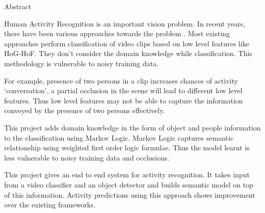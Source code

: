 \begin{center}
\LARGE{Abstract}
\end{center}

\vspace{0.5in}

Human Activity Recognition is an important vision problem.
In recent years, there have been various approaches towards the problem
\cite{actionsInContext,Realistic,improving,Parking}.
Most existing approaches perform classification of video clips 
based on low level features like HoG-HoF. They don't consider the domain knowledge while classification.
This methodology is vulnerable to noisy training data.

For example, presence of two persons in a clip increases chances of activity `conversation',
a partial occlusion in the scene will lead to different low level features.
Thus low level features may not be able to capture the information conveyed by 
the presence of two persons effectively.

This project adds domain knowledge in the form of object and people information
to the classification using Markov Logic. Markov Logic captures semantic relationship
using weighted first order logic formulae. Thus the model learnt is less vulnerable to noisy
training data and occlusions.

This project gives an end to end system for activity recognition. It takes input from 
a video classifier and an object detector and builds semantic model on top of this information.
Activity predictions using this approach shows improvement over the existing frameworks.
